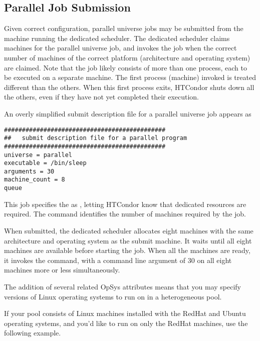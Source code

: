 \subsection{\label{sec:parallel-submit}Parallel Job Submission}

Given correct configuration, parallel universe jobs may be submitted
from the machine running the dedicated scheduler.
The dedicated scheduler claims machines for the parallel universe job,
and invokes the job when the correct number of machines of the
correct platform (architecture and operating system) are claimed.
Note that the job likely consists of more than one process,
each to be executed on a separate machine.
The first process (machine) invoked is treated
different than the others.
When this first process exits, HTCondor shuts down all the others,
even if they have not yet completed their execution.

An overly simplified submit description file for a parallel universe
job appears as

\begin{verbatim}
#############################################
##   submit description file for a parallel program
#############################################
universe = parallel
executable = /bin/sleep
arguments = 30
machine_count = 8
queue 
\end{verbatim}

This job specifies the  as , letting
HTCondor know that dedicated resources are required.  The
 command identifies the number of machines
required by the job. 

When submitted, the dedicated scheduler allocates eight
machines with the same architecture and operating system as the submit
machine.  It waits until all eight machines are available before
starting the job.  When all the machines are ready, it invokes the
 command, with a command line argument of 30
on all eight machines more or less simultaneously.

The addition of several related OpSys attributes means that you may specify versions of Linux operating systems to run on in a heterogeneous pool.

If your pool consists of Linux machines installed with the RedHat and Ubuntu operating systems, and you'd like to run on only the RedHat machines, use the following example.

